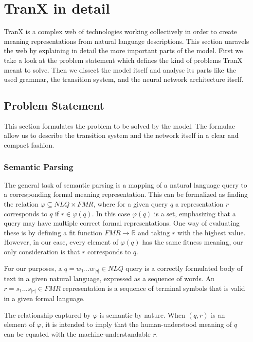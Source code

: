 \section{TranX in detail}
TranX is a complex web of technologies working collectively in order to create meaning
representations from natural language descriptions. This section unravels the web by
explaining in detail the more important parts of the model. First we take a look at
the problem statement which defines the kind of problems TranX meant to solve.
Then we dissect the model itself and analyse its parts like the used grammar,
the transition system, and the neural network architecture itself.

\subsection{Problem Statement}
This section formulates the problem to be solved by the model. The formulae allow
us to describe the transition system and the network itself in a clear and compact
fashion.

\subsubsection{Semantic Parsing}\label{sec:parsing}

The general task of semantic parsing is a mapping of a natural language query to a
corresponding formal meaning representation. This can be formalized as finding
the relation \(\varphi \subseteq NLQ \times FMR\)\label{form:fmr}, where for
a given query \(q\) a representation \(r\) corresponds to \(q\) if 
\(r \in \varphi(q)\). In this case \( \varphi(q) \) is a set, emphasizing
that a query may have multiple correct formal representations. One way of 
evaluating these is by defining a fit function \( FMR \to \mathbb{R} \)
and taking \( r \) with the highest value. However, in our case, every
element of \( \varphi(q) \) has the same fitness meaning, our only
consideration is that \(r\) corresponds to \(q\).

For our purposes, a \(q = w_{1} \dots w_{|q|} \in NLQ\) query is a correctly
formulated body of text in a given natural language, expressed as a sequence of words.
An \(r = s_{1} ... s_{|r|} \in FMR\) representation is a sequence of terminal symbols
that is valid in a given formal language.

The relationship captured by \(\varphi\) is semantic by nature. When \((q, r)\) is
an element of \(\varphi\), it is intended to imply that the human-understood
meaning of \(q\) can be equated with the machine-understandable \(r\). 
 
